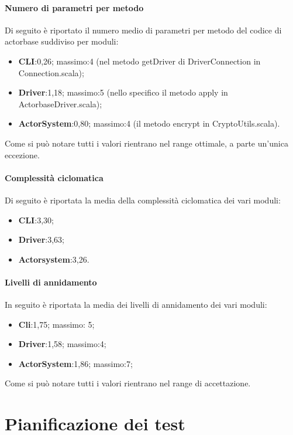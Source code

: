 \documentclass{scalatekids-article}
\begin{document}
	\paragraph{Numero di parametri per metodo}
	Di seguito è riportato il numero medio di parametri per
	metodo del codice di actorbase suddiviso per moduli:
	\begin{itemize}
		\item \textbf{CLI}:0,26; massimo:4 (nel metodo getDriver di  DriverConnection in Connection.scala);
		\item \textbf{Driver}:1,18; massimo:5 (nello specifico il metodo apply in ActorbaseDriver.scala);
		\item \textbf{ActorSystem}:0,80; massimo:4 (il metodo encrypt in CryptoUtils.scala).
	\end{itemize}
	Come si può notare tutti i valori rientrano nel range ottimale, a parte un'unica eccezione.
	
	
	\paragraph{Complessità ciclomatica}
	Di seguito è riportata la media della complessità ciclomatica dei vari moduli:
	\begin{itemize}
		\item \textbf{CLI}:3,30;
		\item \textbf{Driver}:3,63;
		\item \textbf{Actorsystem}:3,26.
	\end{itemize}
	
	\paragraph{Livelli di annidamento}
	In seguito è riportata la media dei livelli di annidamento dei vari moduli:
	\begin{itemize}
		\item \textbf{Cli}:1,75; massimo: 5;
		\item \textbf{Driver}:1,58; massimo:4;
		\item \textbf{ActorSystem}:1,86; massimo:7;
	\end{itemize}
	Come si può notare tutti i valori rientrano nel range di accettazione.

\newpage

\section{Pianificazione dei test}
\end{document}
